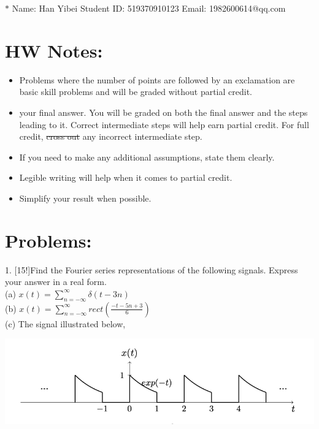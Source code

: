 \documentclass[12pt,a4paper]{article}
\begin{document}
\noindent

\noindent{}

\begin{center}

\footnotesize{\color{blue}$*$ Name: Han Yibei \quad Student ID: 519370910123 \quad Email: 1982600614@qq.com}
\end{center}

\section*{HW Notes:}
\begin{itemize}
    \item Problems where the number of points are followed by an exclamation are basic skill problems and will be graded without partial credit.
    \item {} your final answer. You will be graded on both the final answer and the steps leading to it. Correct intermediate steps will help earn partial credit.
    For full credit, \sout{cross out} any incorrect intermediate step.
    \item If you need to make any additional assumptions, state them clearly.
    \item Legible writing will help when it comes to partial credit.
    \item Simplify your result when possible.
\end{itemize}

\newpage
\section*{Problems:}
\normalsize
\begin{tcolorbox}[colback = white]
1. [15!]Find the Fourier series representations of the following signals. Express your answer in a real form.\\
(a) $x(t)=\sum_{n=-\infty}^{\infty}\delta(t-3n)$\\
(b) $x(t)=\sum_{n=-\infty}^{\infty}rect(\frac{-t-5n+3}{6})$\\
(c) The signal illustrated below,
\begin{center}
    \includegraphics[scale=0.4]{p1(c).png}
\end{center}
\end{tcolorbox}
\end{document}

